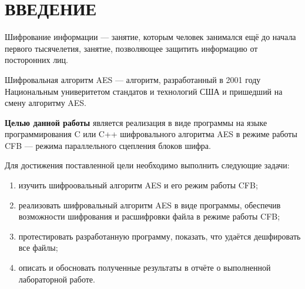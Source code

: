 \chapter*{ВВЕДЕНИЕ}

Шифрование информации --- занятие, которым человек занимался ещё до начала первого тысячелетия, занятие, позволяющее защитить информацию от посторонних лиц. 

Шифровальная алгоритм AES --- алгоритм, разработанный в 2001 году Национальным универитетом стандатов и технологий США и пришедший на смену алгоритму AES.

\textbf{Целью данной работы} является реализация в виде программы на языке программирования C или C++ шифровального алгоритма AES в режиме работы CFB --- режима параллельного сцепления блоков шифра.

Для достижения поставленной цели необходимо выполнить следующие задачи:
\begin{enumerate}[label=\arabic*)]
	\item изучить шифроовальный алгоритм AES и его режим работы CFB;
	\item реализовать шифровальный алгоритм AES в виде программы, обеспечив возможности шифрования и расшифровки файла в режиме работы CFB;
	\item протестировать разработанную программу, показать, что удаётся дешфировать все файлы;
	\item описать и обосновать полученные результаты в отчёте о выполненной лабораторной работе.
\end{enumerate}
